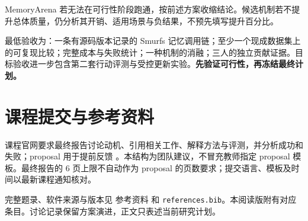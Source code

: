 \documentclass[UTF8,a4paper,zihao=5]{ctexart}
\begin{document}
MemoryArena 若无法在可行性阶段跑通，按前述方案收缩结论。候选机制若不提升总体质量，仍分析其开销、适用场景与负结果，不预先填写提升百分比。

最低验收为：一条有源码版本记录的 Smurfs 记忆调用链；至少一个现成数据集上的可复现比较；完整成本与失败统计；一种机制的消融；三人的独立贡献证据。目标验收进一步包含第二套行动评测与受控更新实验。\textbf{先验证可行性，再冻结最终计划。}

\section{课程提交与参考资料}
课程官网要求最终报告讨论动机、引用相关工作、解释方法与评测，并分析成功和失败；proposal 用于提前反馈 \cite{course2026}。本结构为团队建议，不冒充教师指定 proposal 模板。最终报告的 6 页上限不自动作为 proposal 的页数要求；提交语言、模板及时间以最新课程通知核对。

完整题录、软件来源与版本见 参考资料 和 {\small\texttt{references.bib}}。本阅读版附有对应条目。讨论记录保留方案演进，正文只表述当前研究计划。
\end{document}
